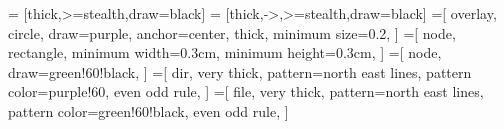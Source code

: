 \newcommand{\weight}[1]{node[midway,sloped,above] {\scalebox{0.7}{\textsl{\textcolor{purple}{#1}}}}}
  = [thick,>=stealth,draw=black]
 = [thick,->,>=stealth,draw=black]
=[
  overlay,
  circle,
  draw=purple,
  anchor=center,
  thick,
  minimum size=0.2,
]
=[
  node,
  rectangle,
  minimum width=0.3cm,
  minimum height=0.3cm,
]
=[
  node,
  draw=green!60!black,
]
=[
  dir,
  very thick,
  pattern=north east lines,
  pattern color=purple!60,
  even odd rule,
]
=[
  file,
  very thick,
  pattern=north east lines,
  pattern color=green!60!black,
  even odd rule,
]

\IgnoreSpacesOn
\prgNewFunction {} {
}
\IgnoreSpacesOff

